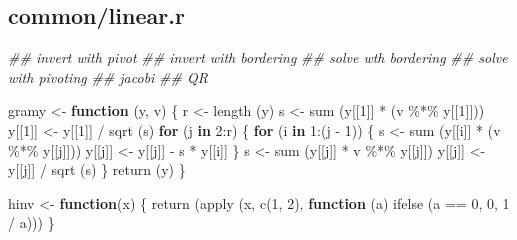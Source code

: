 \documentclass[
  12pt,
  letterpaper,
  DIV=11,
  numbers=noendperiod]{scrreprt}
\newenvironment{Shaded}{\begin{snugshade}}{\end{snugshade}}
\newcommand{\ControlFlowTok}[1]{\textcolor[rgb]{0.00,0.23,0.31}{\textbf{#1}}}
\newcommand{\DecValTok}[1]{\textcolor[rgb]{0.68,0.00,0.00}{#1}}
\newcommand{\DocumentationTok}[1]{\textcolor[rgb]{0.37,0.37,0.37}{\textit{#1}}}
\newcommand{\FunctionTok}[1]{\textcolor[rgb]{0.28,0.35,0.67}{#1}}
\newcommand{\NormalTok}[1]{\textcolor[rgb]{0.00,0.23,0.31}{#1}}
\newcommand{\OtherTok}[1]{\textcolor[rgb]{0.00,0.23,0.31}{#1}}
\newcommand{\SpecialCharTok}[1]{\textcolor[rgb]{0.37,0.37,0.37}{#1}}
\theoremstyle{remark}
\begin{document}
\subsection*{common/linear.r}\label{aplinearcode}

\begin{Shaded}
\begin{Highlighting}[]
\DocumentationTok{\#\# invert with pivot}
\DocumentationTok{\#\# invert with bordering}
\DocumentationTok{\#\# solve wth bordering}
\DocumentationTok{\#\# solve with pivoting}
\DocumentationTok{\#\# jacobi}
\DocumentationTok{\#\# QR}

\NormalTok{gramy }\OtherTok{\textless{}{-}} \ControlFlowTok{function}\NormalTok{ (y, v) \{}
\NormalTok{  r }\OtherTok{\textless{}{-}} \FunctionTok{length}\NormalTok{ (y)}
\NormalTok{  s }\OtherTok{\textless{}{-}} \FunctionTok{sum}\NormalTok{ (y[[}\DecValTok{1}\NormalTok{]] }\SpecialCharTok{*}\NormalTok{ (v }\SpecialCharTok{\%*\%}\NormalTok{ y[[}\DecValTok{1}\NormalTok{]]))}
\NormalTok{  y[[}\DecValTok{1}\NormalTok{]] }\OtherTok{\textless{}{-}}\NormalTok{ y[[}\DecValTok{1}\NormalTok{]] }\SpecialCharTok{/} \FunctionTok{sqrt}\NormalTok{ (s)}
  \ControlFlowTok{for}\NormalTok{ (j }\ControlFlowTok{in} \DecValTok{2}\SpecialCharTok{:}\NormalTok{r) \{}
    \ControlFlowTok{for}\NormalTok{ (i }\ControlFlowTok{in} \DecValTok{1}\SpecialCharTok{:}\NormalTok{(j }\SpecialCharTok{{-}} \DecValTok{1}\NormalTok{)) \{}
\NormalTok{      s }\OtherTok{\textless{}{-}} \FunctionTok{sum}\NormalTok{ (y[[i]] }\SpecialCharTok{*}\NormalTok{ (v }\SpecialCharTok{\%*\%}\NormalTok{ y[[j]]))}
\NormalTok{      y[[j]] }\OtherTok{\textless{}{-}}\NormalTok{ y[[j]] }\SpecialCharTok{{-}}\NormalTok{ s }\SpecialCharTok{*}\NormalTok{ y[[i]]}
\NormalTok{    \}}
\NormalTok{    s }\OtherTok{\textless{}{-}} \FunctionTok{sum}\NormalTok{ (y[[j]] }\SpecialCharTok{*}\NormalTok{ v }\SpecialCharTok{\%*\%}\NormalTok{ y[[j]])}
\NormalTok{    y[[j]] }\OtherTok{\textless{}{-}}\NormalTok{ y[[j]] }\SpecialCharTok{/} \FunctionTok{sqrt}\NormalTok{ (s)}
\NormalTok{  \}}
  \FunctionTok{return}\NormalTok{ (y)}
\NormalTok{\}}



\NormalTok{hinv }\OtherTok{\textless{}{-}} \ControlFlowTok{function}\NormalTok{(x) \{}
  \FunctionTok{return}\NormalTok{ (}\FunctionTok{apply}\NormalTok{ (x, }\FunctionTok{c}\NormalTok{(}\DecValTok{1}\NormalTok{, }\DecValTok{2}\NormalTok{), }\ControlFlowTok{function}\NormalTok{ (a)}
    \FunctionTok{ifelse}\NormalTok{ (a }\SpecialCharTok{==} \DecValTok{0}\NormalTok{, }\DecValTok{0}\NormalTok{, }\DecValTok{1} \SpecialCharTok{/}\NormalTok{ a)))}
\NormalTok{\}}



\end{Highlighting}
\end{Shaded}
\end{document}
